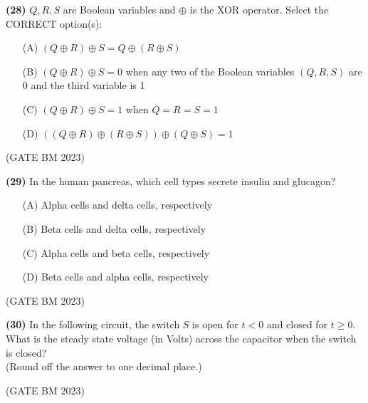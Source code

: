 \documentclass[journal]{IEEEtran}
\numberwithin{equation}{enumi}
\numberwithin{figure}{enumi}
\begin{document}
\textbf{(28)} \( Q, R, S \) are Boolean variables and \( \oplus \) is the XOR operator. Select the CORRECT option(s):

\begin{enumerate}
    \item[(A)] \( (Q \oplus R) \oplus S = Q \oplus (R \oplus S) \)
    \item[(B)] \( (Q \oplus R) \oplus S = 0 \) when any two of the Boolean variables \( (Q, R, S) \) are 0 and the third variable is 1
    \item[(C)] \( (Q \oplus R) \oplus S = 1 \) when \( Q = R = S = 1 \)
    \item[(D)] \( ((Q \oplus R) \oplus (R \oplus S)) \oplus (Q \oplus S) = 1 \)
\end{enumerate}
\hfill (GATE BM 2023)

\textbf{(29)} In the human pancreas, which cell types secrete insulin and glucagon?

\begin{enumerate}
    \item[(A)] Alpha cells and delta cells, respectively
    \item[(B)] Beta cells and delta cells, respectively
    \item[(C)] Alpha cells and beta cells, respectively
    \item[(D)] Beta cells and alpha cells, respectively
\end{enumerate}
\hfill (GATE BM 2023)

\textbf{(30)} In the following circuit, the switch \( S \) is open for \( t < 0 \) and closed for \( t \geq 0 \). What is the steady state voltage (in Volts) across the capacitor when the switch is closed?\\
(Round off the answer to one decimal place.)
\begin{figure}[H]
\centering
{}%

\label{fig:my_label}
\end{figure}
\hfill (GATE BM 2023)
\end{document}
